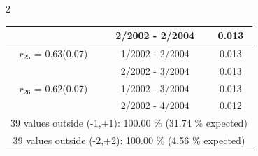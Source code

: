 \begin{multicols}{2}
{\begin{tabular}{ccc}
&        2/2002 -  2/2004 &        0.013  \vspace{-.02in} \\ \hline 
  $r_{25}$ = 0.63(0.07) &       1/2002 -  2/2004 &        0.013   \vspace{-.10in} \\  
&        2/2002 -  3/2004 &        0.013  \vspace{-.02in} \\ \hline 
  $r_{26}$ = 0.62(0.07) &       1/2002 -  3/2004 &        0.013   \vspace{-.10in} \\  
&        2/2002 -  4/2004 &        0.012  \vspace{-.02in} \\ \hline 
\multicolumn{3}{c}{              39 values outside (-1,+1): 100.00  \% (31.74  \% expected)}\vspace{-.10in} \\ 
\multicolumn{3}{c}{              39 values outside (-2,+2): 100.00 \%  (4.56 \% expected) } \\
 \end{tabular} \\ 
 } 
\end{multicols} 
